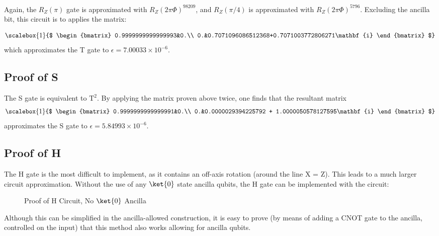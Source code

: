 \documentclass[12pt]{article}
\begin{document}
Again, the $R_Z(\pi)$ gate is approximated with $R_Z(2\pi \Phi)^{98209}$, and $R_Z(\pi/4)$ is approximated with $R_Z(2\pi \Phi)^{5796}$. Excluding the ancilla bit, this circuit is to applies the matrix:

$$
\scalebox{1}{$
\begin{bmatrix}
    0.9999999999999993&0.\\
    0.&0.7071096086512368+0.7071003772806271\mathbf{i}
\end{bmatrix}
$}
$$
which approximates the T gate to $\epsilon = 7.00033 \times 10^{-6}$.


\subsection{Proof of S}
The S gate is equivalent to $\text{T}^2$. By applying the matrix proven above twice, one finds that the resultant matrix
$$
\scalebox{1}{$
\begin{bmatrix}
    0.9999999999999991&0.\\
    0.&0.0000029394225792 + 1.0000050578127595\mathbf{i}
\end{bmatrix}
$}
$$
approximates the S gate to $\epsilon = 5.84993 \times 10^{-6}$.

\subsection{Proof of H}
The H gate is the most difficult to implement, as it contains an off-axis rotation (around the line X = Z). This leads to a much larger circuit approximation. Without the use of any $\ket{0}$ state ancilla qubits, the H gate can be implemented with the circuit:
\begin{figure}[ht]
    \centering
    \caption{Proof of H Circuit, No $\ket{0}$ Ancilla}
    \label{fig:quantum universal set 1 proof of H circuit}
\end{figure}

Although this can be simplified in the ancilla-allowed construction, it is easy to prove (by means of adding a CNOT gate to the ancilla, controlled on the input) that this method also works allowing for ancilla qubits.
\end{document}

